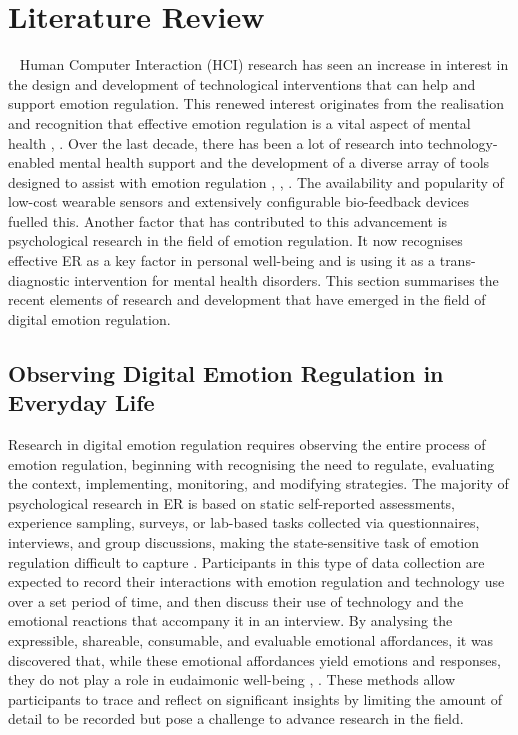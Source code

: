 \newpage 
\section{Literature Review}~\label{sec:literature}
Human Computer Interaction (HCI) research has seen an increase in interest in the design and development of technological interventions that can help and support emotion regulation. This renewed interest originates from the realisation and recognition that effective emotion regulation is a vital aspect of mental health \cite{gross2015emotion}, \cite{davidson1998affective}. Over the last decade, there has been a lot of research into technology-enabled mental health support and the development of a diverse array of tools designed to assist with emotion regulation \cite{wadley2020digital}, \cite{smith2022digital}, \cite{slovak2022designing}. The availability and popularity of low-cost wearable sensors and extensively configurable bio-feedback devices fuelled this. Another factor that has contributed to this advancement is psychological research in the field of emotion regulation. It now recognises effective ER as a key factor in personal well-being and is using it as a trans-diagnostic intervention for mental health disorders. This section summarises the recent elements of research and development that have emerged in the field of digital emotion regulation. 

\subsection{Observing Digital Emotion Regulation in Everyday Life}

Research in digital emotion regulation requires observing the entire process of emotion regulation, beginning with recognising the need to regulate, evaluating the context, implementing, monitoring, and modifying strategies. The majority of psychological research in ER is based on static self-reported assessments, experience sampling, surveys, or lab-based tasks collected via questionnaires, interviews, and group discussions, making the state-sensitive task of emotion regulation difficult to capture \cite{wadley2022future}. Participants in this type of data collection are expected to record their interactions with emotion regulation and technology use over a set period of time, and then discuss their use of technology and the emotional reactions that accompany it in an interview.  By analysing the expressible, shareable, consumable, and evaluable emotional affordances, it was discovered that, while these emotional affordances yield emotions and responses, they do not play a role in eudaimonic well-being \cite{tag2021retrospective}, \cite{steinert2022emotions}. These methods allow participants to trace and reflect on significant insights by limiting the amount of detail to be recorded but pose a challenge to advance research in the field.



